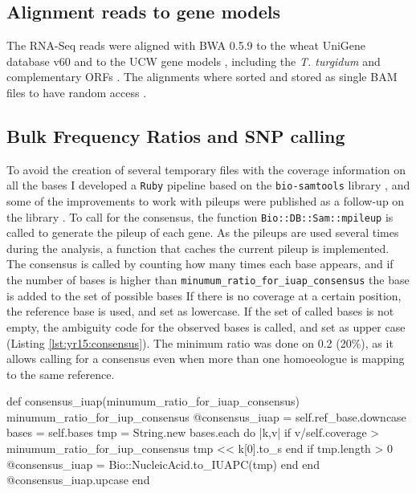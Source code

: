 \subsection{Alignment reads to gene models}
The RNA-Seq reads were aligned with BWA 0.5.9 \citep{Li2009} to the wheat UniGene database v60 \citep{PontiusJUWagnerL2002} and to the UCW gene models \citep{Krasileva2013}, including the \textit{T. turgidum} and complementary ORFs \citep{MASWheat2013}.
The alignments where sorted and stored as single BAM files to have random access \citep{Li2009a}. 


\subsection{Bulk Frequency Ratios and SNP calling}
\label{yr15:sub:bfr}
To avoid the creation of several temporary files with the coverage information on all the bases I developed a \texttt{Ruby} pipeline based on the \texttt{bio-samtools} library \citep{Ramirez-Gonzalez2012}, and some of the improvements to work with pileups were published as a follow-up on the library \citep{Etherington2015}.
To call for the consensus, the function \texttt{Bio::DB::Sam::mpileup} is called to generate the pileup of each gene. 
As the pileups are used several times during the analysis, a function that caches the current pileup is implemented.
The consensus is called by counting how many times each base appears, and if the number of bases is higher than \texttt{minumum\_ratio\_for\_iuap\_consensus} the base is added to the set of possible bases \citep{Cornish-Bowden1985} 
If there is no coverage at a certain position, the reference base is used, and set as lowercase. 
If the set of called bases is not empty, the ambiguity code for the observed bases is called, and set as upper case (Listing \ref{lst:yr15:consensus}).
The minimum ratio was done on 0.2 (20\%), as it allows calling for a consensus even when more than one homoeologue is mapping to the same reference.

\begin{code}[language=Ruby,caption=Method to call for the consensus on progenitors from a pileup, label=lst:yr15:consensus]
def consensus_iuap(minumum_ratio_for_iuap_consensus)
  minumum_ratio_for_iup_consensus
  @consensus_iuap = self.ref_base.downcase
  bases = self.bases
  tmp = String.new
  bases.each do |k,v|
    if v/self.coverage > minumum_ratio_for_iup_consensus
      tmp << k[0].to_s
    end 
    if tmp.length > 0
      @consensus_iuap = Bio::NucleicAcid.to_IUAPC(tmp)
    end
  end 
  @consensus_iuap.upcase
end
\end{code}

